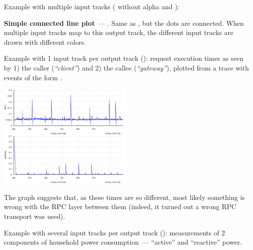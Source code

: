 \documentclass{article}
\begin{document}
Example with multiple input tracks ( without alpha and ):

\begin{figure}[h!]
\centering
{}
\end{figure}

\pagebreak
\noindent
\textbf{Simple connected line plot}~--- . Same as , but the dots are connected. When multiple input tracks map to this output track, the different input tracks are drawn with different colors.

Example with 1 input track per output track (): request execution times as seen by 1) the caller (\emph{``client''}) and 2) the callee (\emph{``gateway''}), plotted from a trace with events of the form .

\centerline{\includegraphics[width=0.5\textwidth]{pics/tplot/lines.png}}

The graph suggests that, as these times are so different, most likely something is wrong with the RPC layer between them (indeed, it turned out a wrong RPC transport was used).

Example with several input tracks per output track (): measurements of 2 components of household power consumption~--- ``active'' and ``reactive'' power.
\end{document}
